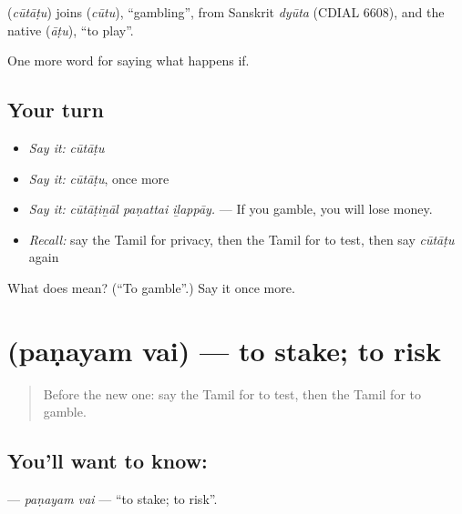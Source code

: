 \begin{cousinweb}
\textbf{} (\emph{cūtāṭu}) joins  (\emph{cūtu}), \textquotedblleft{}gambling\textquotedblright{}, from Sanskrit \emph{dyūta} (CDIAL 6608), and the native  (\emph{āṭu}), \textquotedblleft{}to play\textquotedblright{}.
\end{cousinweb}

\begin{grammarlens}[title={What you've built}]
One more word for saying what happens if.
\end{grammarlens}

\subsection*{Your turn}
\begin{itemize}
\raggedright
  \item \emph{Say it:} \emph{cūtāṭu}
  \item \emph{Say it:} \emph{cūtāṭu}, once more
  \item \emph{Say it:} \emph{cūtāṭiṉāl paṇattai iḻappāy.} — If you gamble, you will lose money.
  \item \emph{Recall:} say the Tamil for privacy, then the Tamil for to test, then say \emph{cūtāṭu} again
\end{itemize}

\begin{tcolorbox}[breakable,colback=teal!4,colframe=teal!35!black,title={Before you move on}]
What does  mean? (\textquotedblleft{}To gamble\textquotedblright{}.) Say it once more.
\end{tcolorbox}
\section[\texorpdfstring{\ta{பணயம்} \ta{வை} (paṇayam vai)}{பணயம் வை (paṇayam vai)}]{  (paṇayam vai) — to stake; to risk}

\label{lesson:TA-C544-panayam-vai}



\begin{quote}
Before the new one: say the Tamil for to test, then the Tamil for to gamble.
\end{quote}

\subsection*{You'll want to know:  }
\textbf{ } — \emph{paṇayam vai} — \textquotedblleft{}to stake; to risk\textquotedblright{}.

